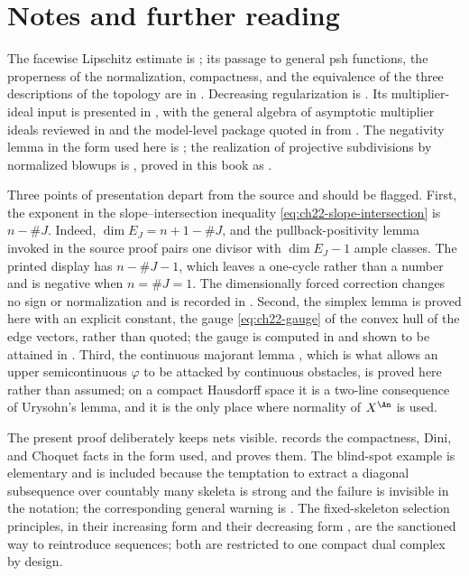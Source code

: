 \section*{Notes and further reading}

The facewise Lipschitz estimate is \cite[Theorem~6.1]{BFJ16}; its passage to
general psh functions, the properness of the normalization, compactness, and
the equivalence of the three descriptions of the topology are in
\cite[Section~7]{BFJ16}.  Decreasing regularization is
\cite[Theorem~8.7]{BFJ16}.  Its multiplier-ideal input is presented in
, with the general algebra of asymptotic multiplier
ideals reviewed in  and the model-level package quoted in
 from \cite[Appendix~B]{BFJ16}.  The negativity
lemma in the form used here is \cite[Lemma~1.6]{BFJ16}; the realization of
projective subdivisions by normalized blowups is
\cite[Theorem~3.15]{BFJ16}, proved in this book as
.

Three points of presentation depart from the source and should be flagged.
First, the exponent in the slope--intersection inequality
\eqref{eq:ch22-slope-intersection} is $n-\#J$.  Indeed,
$\dim E_J=n+1-\#J$, and the pullback-positivity lemma invoked in the
source proof pairs one divisor with $\dim E_J-1$ ample classes.  The
printed display \cite[(6.3)]{BFJ16} has $n-\#J-1$, which leaves a
one-cycle rather than a number and is negative when $n=\#J=1$.  The
dimensionally forced correction changes no sign or normalization and is
recorded in .  Second, the simplex
lemma is proved here with an explicit constant, the gauge
\eqref{eq:ch22-gauge} of the convex hull of the edge vectors, rather than
quoted; the gauge is computed in
 and shown to be attained in
.  Third, the continuous majorant lemma
, which is what allows an upper
semicontinuous $\varphi$ to be attacked by continuous obstacles, is proved
here rather than assumed; on a compact Hausdorff space it is a two-line
consequence of Urysohn's lemma, and it is the only place where normality of
$X^{\An}$ is used.

The present proof deliberately keeps nets visible.   records
the compactness, Dini, and Choquet facts in the form used, and
 proves them.  The blind-spot example
 is elementary and is included because
the temptation to extract a diagonal subsequence over countably many
skeleta is strong and the failure is invisible in the notation; the
corresponding general warning is
.  The fixed-skeleton selection
principles, in their increasing form
 and their decreasing form
, are the sanctioned way to
reintroduce sequences; both are restricted to one compact dual complex by
design.

